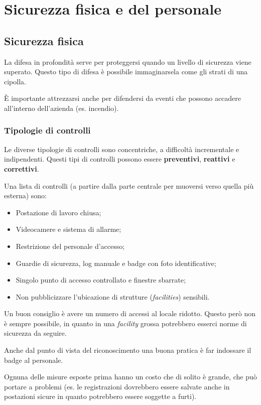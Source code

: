 \part{Sicurezza fisica e del personale}
\label{SFDP}
\chapter{Sicurezza fisica}

La difesa in profondità serve per proteggersi quando un livello di sicurezza
viene superato. Questo tipo di difesa è possibile immaginarsela come gli strati
di una cipolla.

È importante attrezzarsi anche per difendersi da eventi che possono accadere
all'interno dell'azienda (es. incendio).

\section{Tipologie di controlli}

Le diverse tipologie di controlli sono concentriche, a difficoltà incrementale e
indipendenti. Questi tipi di controlli possono essere \textbf{preventivi},
\textbf{reattivi} e \textbf{correttivi}.

Una lista di controlli (a partire dalla parte centrale per muoversi
verso quella più esterna) sono:

\begin{itemize}
\item Postazione di lavoro chiusa;
\item Videocamere e sistema di allarme;
\item Restrizione del personale d'accesso;
\item Guardie di sicurezza, log manuale e badge con foto identificative;
\item Singolo punto di accesso controllato e finestre sbarrate;
\item Non pubblicizzare l'ubicazione di strutture (\textit{facilities})
sensibili.
\end{itemize}

Un buon consiglio è avere un numero di accessi al locale ridotto. Questo però
non è sempre possibile, in quanto in una \textit{facility} grossa potrebbero
esserci norme di sicurezza da seguire.

Anche dal punto di vista del riconoscimento una buona pratica è
far indossare il badge al personale.

Ognuna delle misure esposte prima hanno un costo che di solito è grande, che
può portare a problemi (es. le registrazioni dovrebbero essere
salvate anche in postazioni sicure in quanto potrebbero essere soggette a furti).

